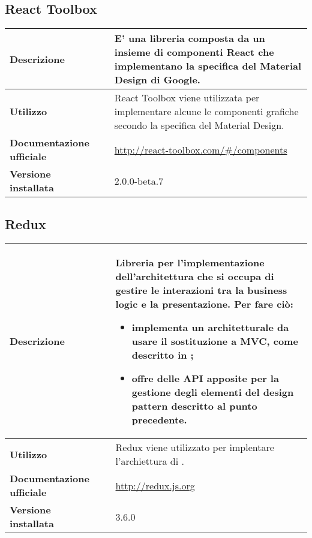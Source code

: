 \subsection{React Toolbox}
\label{React Toolbox}
\begin{table}[H]
	\centering
	\begin{tabular}{p{2cm}p{0.5cm}p{11.5cm}}
		\arrayrulecolor{lightgray}
		\toprule
		\textbf{Descrizione} & &
		E' una libreria \js{} composta da un insieme di componenti React che implementano la specifica del Material Design di Google.
		\\ \midrule
		\textbf{Utilizzo} & &
		React Toolbox viene utilizzata per implementare alcune le componenti grafiche secondo la specifica del Material Design.
		\\ \midrule
		\textbf{Documentazione ufficiale} & &
		\url{http://react-toolbox.com/#/components}
		\\ \midrule
		\textbf{Versione installata} & &
		2.0.0-beta.7
		\\\bottomrule
	\end{tabular}
\end{table}

\vspace{40px}
\subsection{Redux}
\label{Redux}
\begin{table}[H]
	\centering
	\begin{tabular}{p{2cm}p{0.5cm}p{11.5cm}}
		\arrayrulecolor{lightgray}
		\toprule
		\textbf{Descrizione} & &
		Libreria per l’implementazione dell’architettura che si occupa di gestire le interazioni tra la business logic e la presentazione.
		Per fare ciò:
		\begin{itemize}
			\item implementa un \glo{Design pattern}{design pattern} architetturale da usare il sostituzione a MVC, come descritto in
			\nameref{dp_redux};
			\item offre delle API apposite per la gestione degli elementi del design pattern descritto al punto precedente.
		\end{itemize}
		\\ \midrule
		\textbf{Utilizzo} & &
		Redux viene utilizzato per implentare l'archiettura di \progetto.
		\\ \midrule
		\textbf{Documentazione ufficiale} & &
		\url{http://redux.js.org}
		\\ \midrule
		\textbf{Versione installata} & &
		3.6.0
		\\\bottomrule
	\end{tabular}
\end{table}

